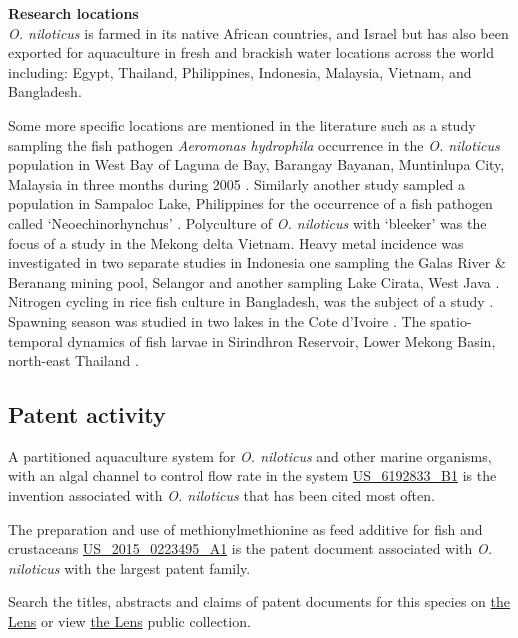 \documentclass[openany]{book}
\theoremstyle{definition}
\theoremstyle{definition}
\theoremstyle{definition}
\theoremstyle{remark}
\begin{document}
\textbf{Research locations}\\
\emph{O. niloticus} is farmed in its native African countries, and
Israel but has also been exported for aquaculture in fresh and brackish
water locations across the world including: Egypt, Thailand,
Philippines, Indonesia, Malaysia, Vietnam, and Bangladesh.

Some more specific locations are mentioned in the literature such as a
study sampling the fish pathogen \emph{Aeromonas hydrophila} occurrence
in the \emph{O. niloticus} population in West Bay of Laguna de Bay,
Barangay Bayanan, Muntinlupa City, Malaysia in three months during 2005
\citep{Cabrera_2006}. Similarly another study sampled a population in
Sampaloc Lake, Philippines for the occurrence of a fish pathogen called
`Neoechinorhynchus' \citep{de_la_Cruz_2012}. Polyculture of \emph{O.
niloticus} with `bleeker' was the focus of a study in the Mekong delta
Vietnam. Heavy metal incidence was investigated in two separate studies
in Indonesia one sampling the Galas River \& Beranang mining pool,
Selangor and another sampling Lake Cirata, West Java
\citep{Baharom_2015, Salami_2008}. Nitrogen cycling in rice fish culture
in Bangladesh, was the subject of a study \citep{Oehme_2007}. Spawning
season was studied in two lakes in the Cote d'Ivoire
\citep{Duponchelle_1999}. The spatio-temporal dynamics of fish larvae in
Sirindhron Reservoir, Lower Mekong Basin, north-east Thailand
\citep{Jutagate_2016}.

\hypertarget{patent-activity-5}{%
\subsection{Patent activity}\label{patent-activity-5}}

A partitioned aquaculture system for \emph{O. niloticus} and other
marine organisms, with an algal channel to control flow rate in the
system
\href{https://www.lens.org/lens/patent/US_6192833_B1}{US\_6192833\_B1}
is the invention associated with \emph{O. niloticus} that has been cited
most often.

The preparation and use of methionylmethionine as feed additive for fish
and crustaceans
\href{https://www.lens.org/lens/patent/US_2015_0223495_A1}{US\_2015\_0223495\_A1}
is the patent document associated with \emph{O. niloticus} with the
largest patent family.

Search the titles, abstracts and claims of patent documents for this
species on
\href{https://www.lens.org/lens/search?q=title:(\%22Oreochromis\%20niloticus\%22)\%20OR\%20abstract:(\%22Oreochromis\%20niloticus\%22)\%20OR\%20claims:(\%22Oreochromis\%20niloticus\%22)\&l=en\&preview=true}{the
Lens} or view \href{https://www.lens.org/lens/collection/24913}{the
Lens} public collection.
\end{document}
